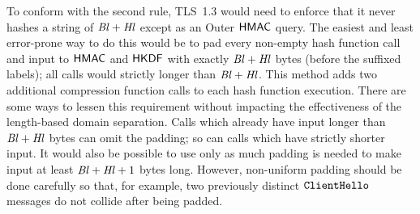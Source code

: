 To conform with the second rule, TLS~1.3 would need to enforce that it never hashes a string of $\mathit{Bl}+\mathit{Hl}$ except as an Outer $\mathsf{HMAC}$ query. 
The easiest and least error-prone way to do this would be to pad every non-empty hash function call and input to $\mathsf{HMAC}$ and $\mathsf{HKDF}$ with exactly $\mathit{Bl} + \mathit{Hl}$ bytes (before the suffixed labels); all calls would strictly longer than $\mathit{Bl}+\mathit{Hl}$.
This method adds two additional compression function calls to each hash function execution.
There are some ways to lessen this requirement without impacting the effectiveness of the length-based domain separation.
Calls which already have input longer than $\mathit{Bl}+\mathit{Hl}$ bytes can omit the padding; so can calls which have strictly shorter input.
It would also be possible to use only as much padding is needed to make input at least $\mathit{Bl}+\mathit{Hl}+1$ bytes long.
However, non-uniform padding should be done carefully so that, for example, two previously distinct $\mathtt{ClientHello}$ messages do not collide after being padded.
\fi